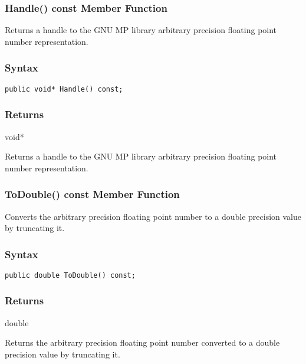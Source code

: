 \documentclass[a4paper,oneside,11.000000pt]{book}
\begin{document}
\hypertarget{System.Numerics.Multiprecision.BigFloat.Handle.C.P.System.Numerics.Multiprecision.BigFloat}{\subsubsection*{Handle() const Member Function}}
\begin{flushleft}
Returns a handle to the GNU MP library arbitrary precision floating point number representation.

\end{flushleft}
\subsubsection*{Syntax}\texttt{public void* Handle() const;}

\subsubsection*{Returns}void*
\begin{flushleft}
Returns a handle to the GNU MP library arbitrary precision floating point number representation.

\end{flushleft}
\clearpage

\hypertarget{System.Numerics.Multiprecision.BigFloat.ToDouble.C.P.System.Numerics.Multiprecision.BigFloat}{\subsubsection*{ToDouble() const Member Function}}
\begin{flushleft}
Converts the arbitrary precision floating point number to a double precision value by truncating it.

\end{flushleft}
\subsubsection*{Syntax}\texttt{public double ToDouble() const;}

\subsubsection*{Returns}double
\begin{flushleft}
Returns the arbitrary precision floating point number converted to a double precision value by truncating it.

\end{flushleft}
\clearpage
\end{document}
